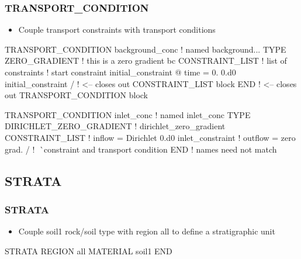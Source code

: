 \documentclass{beamer}
\newcommand\redcomment[1]{{{\color{red} #1}}}
\newcommand\bluecomment[1]{{{\color{blue} #1}}}
\newcommand\greencomment[1]{{{\color{green} #1}}}
\begin{document}
\begin{frame}\frametitle{TRANSPORT\_CONDITION}

\begin{itemize}
  \item Couple transport constraints with transport conditions
\end{itemize}
\begin{semiverbatim}
TRANSPORT_CONDITION background_conc \bluecomment{! named \greencomment{background...}}
  TYPE ZERO_GRADIENT       \bluecomment{! this is a \redcomment{zero gradient} bc}
  CONSTRAINT_LIST          \bluecomment{! list of constraints}
    \bluecomment{! start constraint \redcomment{initial_constraint} @ time = \redcomment{0.}}
    0.d0 initial_constraint
  /  \bluecomment{! <-- closes out CONSTRAINT\_LIST block}
END  \bluecomment{! <-- closes out TRANSPORT\_CONDITION block}

TRANSPORT_CONDITION inlet_conc  \bluecomment{! named \greencomment{inlet_conc}}
  TYPE DIRICHLET_ZERO_GRADIENT  \bluecomment{! \redcomment{dirichlet_zero_gradient}}
  CONSTRAINT_LIST               \bluecomment{! inflow = Dirichlet}
    0.d0 inlet_constraint       \bluecomment{! outflow = zero grad.}
  /    \bluecomment{! ^^^^^ constraint and transport condition}
END    \bluecomment{!         names need not match}

\end{semiverbatim}

\end{frame}

\subsection{STRATA}

\begin{frame}[fragile]\frametitle{STRATA}

\begin{itemize}
\item Couple \greencomment{soil1} rock/soil type with region \greencomment{all} to define a stratigraphic unit
\end{itemize}

\begin{semiverbatim}

STRATA
  REGION all
  MATERIAL soil1
END


\end{semiverbatim}

\end{frame}
\end{document}
